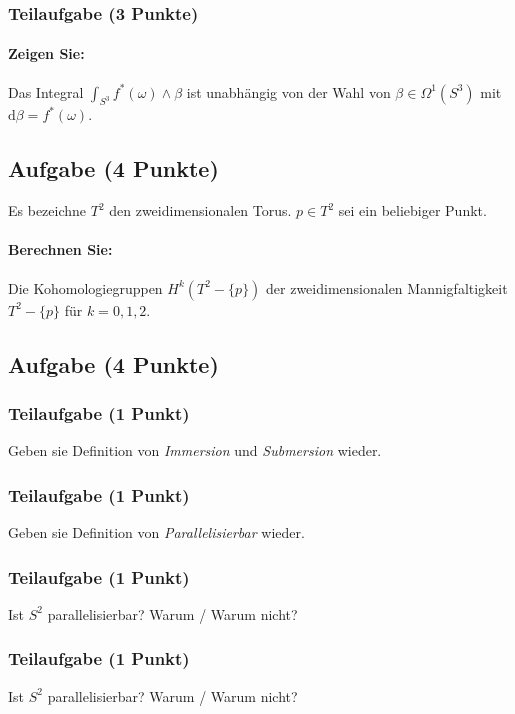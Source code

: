 \documentclass[12pt]{article}
\renewcommand{\d}{\text{d}}
\begin{document}
\subsubsection{Teilaufgabe (3 Punkte)}
\paragraph{Zeigen Sie:} Das Integral $\int_{S^3} f^*(\omega) \wedge \beta$ ist unabhängig von der Wahl von $\beta \in \Omega^1(S^3)$ mit $\d \beta = f^*(\omega)$.

\subsection{Aufgabe (4 Punkte)}
Es bezeichne $T^2$ den zweidimensionalen Torus. $p \in T^2$ sei ein beliebiger Punkt.
\paragraph{Berechnen Sie:} Die Kohomologiegruppen $H^k(T^2 - \{p\})$ der zweidimensionalen Mannigfaltigkeit $T^2 - \{p\}$ für $k = 0,1,2$.

\subsection{Aufgabe (4 Punkte)}
\subsubsection{Teilaufgabe (1 Punkt)}
Geben sie Definition von \textit{Immersion} und \textit{Submersion} wieder.
\subsubsection{Teilaufgabe (1 Punkt)}
Geben sie Definition von \textit{Parallelisierbar} wieder.
\subsubsection{Teilaufgabe (1 Punkt)}
Ist $S^2$ parallelisierbar? Warum / Warum nicht?
\subsubsection{Teilaufgabe (1 Punkt)}
Ist $S^2$ parallelisierbar? Warum / Warum nicht?
\end{document}
